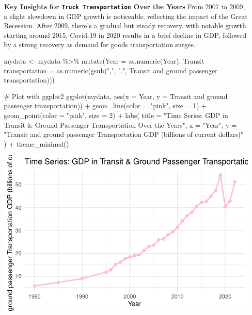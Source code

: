 \documentclass[
  letterpaper,
  DIV=11,
  numbers=noendperiod]{scrreprt}
\newenvironment{Shaded}{\begin{snugshade}}{\end{snugshade}}
\newcommand{\AttributeTok}[1]{\textcolor[rgb]{0.40,0.45,0.13}{#1}}
\newcommand{\CommentTok}[1]{\textcolor[rgb]{0.37,0.37,0.37}{#1}}
\newcommand{\DecValTok}[1]{\textcolor[rgb]{0.68,0.00,0.00}{#1}}
\newcommand{\FunctionTok}[1]{\textcolor[rgb]{0.28,0.35,0.67}{#1}}
\newcommand{\NormalTok}[1]{\textcolor[rgb]{0.00,0.23,0.31}{#1}}
\newcommand{\OtherTok}[1]{\textcolor[rgb]{0.00,0.23,0.31}{#1}}
\newcommand{\SpecialCharTok}[1]{\textcolor[rgb]{0.37,0.37,0.37}{#1}}
\newcommand{\StringTok}[1]{\textcolor[rgb]{0.13,0.47,0.30}{#1}}
\begin{document}
\textbf{Key Insights for \texttt{Truck\ Transportation} Over the Years}
From 2007 to 2009, a slight slowdown in GDP growth is noticeable,
reflecting the impact of the Great Recession. After 2009, there's a
gradual but steady recovery, with notable growth starting around 2015.
Covid-19 in 2020 results in a brief decline in GDP, followed by a strong
recovery as demand for goods transportation surges.

\begin{Shaded}
\begin{Highlighting}[]
\NormalTok{mydata }\OtherTok{\textless{}{-}}\NormalTok{ mydata }\SpecialCharTok{\%\textgreater{}\%}
  \FunctionTok{mutate}\NormalTok{(}\AttributeTok{Year =} \FunctionTok{as.numeric}\NormalTok{(Year),}
         \StringTok{\textasciigrave{}}\AttributeTok{Transit transportation}\StringTok{\textasciigrave{}} \OtherTok{=} \FunctionTok{as.numeric}\NormalTok{(}\FunctionTok{gsub}\NormalTok{(}\StringTok{","}\NormalTok{, }\StringTok{"."}\NormalTok{, }\StringTok{\textasciigrave{}}\AttributeTok{Transit and ground passenger transportation}\StringTok{\textasciigrave{}}\NormalTok{)))}

\CommentTok{\# Plot with ggplot2}
\FunctionTok{ggplot}\NormalTok{(mydata, }\FunctionTok{aes}\NormalTok{(}\AttributeTok{x =}\NormalTok{ Year, }\AttributeTok{y =} \StringTok{\textasciigrave{}}\AttributeTok{Transit and ground passenger transportation}\StringTok{\textasciigrave{}}\NormalTok{)) }\SpecialCharTok{+}
  \FunctionTok{geom\_line}\NormalTok{(}\AttributeTok{color =} \StringTok{"pink"}\NormalTok{, }\AttributeTok{size =} \DecValTok{1}\NormalTok{) }\SpecialCharTok{+}
  \FunctionTok{geom\_point}\NormalTok{(}\AttributeTok{color =} \StringTok{"pink"}\NormalTok{, }\AttributeTok{size =} \DecValTok{2}\NormalTok{) }\SpecialCharTok{+}
  \FunctionTok{labs}\NormalTok{(}
    \AttributeTok{title =} \StringTok{"Time Series: GDP in Transit \& Ground Passenger Transportation Over the Years"}\NormalTok{,}
    \AttributeTok{x =} \StringTok{"Year"}\NormalTok{,}
    \AttributeTok{y =} \StringTok{"Transit and ground passenger Transportation GDP (billions of current dollars)"}
\NormalTok{  ) }\SpecialCharTok{+}
  \FunctionTok{theme\_minimal}\NormalTok{()}
\end{Highlighting}
\end{Shaded}

\includegraphics{FinalProject_Abigail_files/figure-pdf/unnamed-chunk-6-1.pdf}
\end{document}
